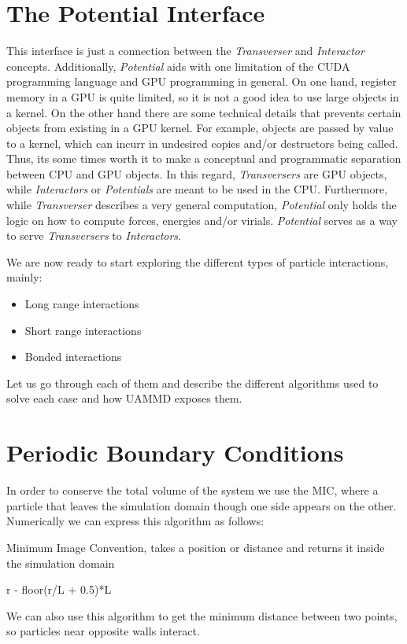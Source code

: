 \documentclass[ twoside,openright,titlepage,numbers=noenddot,%
headinclude,footinclude,cleardoublepage=empty,abstract=on,
BCOR=5mm,paper=a4,fontsize=11pt, dvipsnames
]{scrreprt}
\newcommand{\uammd}{\gls{UAMMD}\xspace}
\newcommand{\gpu}{\gls{GPU}\xspace}
\begin{document}
\section{The Potential Interface} \label{sec:potential}

This interface is just a connection between the \emph{Transverser} and \emph{Interactor} concepts. Additionally, \emph{Potential} aids with one limitation of the CUDA programming language and \gls{GPU} programming in general. On one hand, register memory in a \gpu is quite limited, so it is not a good idea to use large objects in a kernel. On the other hand there are some technical details that prevents certain objects from existing in a \gpu kernel. For example, objects are passed by value to a kernel, which can incurr in undesired copies and/or destructors being called. Thus, its some times worth it to make a conceptual and programmatic separation between CPU and \gpu objects.
In this regard, \emph{Transversers} are \gpu objects, while \emph{Interactors} or \emph{Potentials} are meant to be used in the CPU.
Furthermore, while \emph{Transverser} describes a very general computation, \emph{Potential} only holds the logic on how to compute forces, energies and/or virials.
\emph{Potential} serves as a way to serve \emph{Transversers} to \emph{Interactors}.


We are now ready to start exploring the different types of particle interactions, mainly:
\begin{itemize}
\item Long range interactions
\item Short range interactions
\item Bonded interactions
\end{itemize}

Let us go through each of them and describe the different algorithms used to solve each case and how \uammd exposes them.


\section{Periodic Boundary Conditions}
In order to conserve the total volume of the system we use the \gls{MIC}, where a particle that leaves the simulation domain though one side appears on the other.
Numerically we can express this algorithm as follows:

\begin{algorithm}
  \caption{Minimum Image Convention, takes a position or distance and returns it inside the simulation domain}
  \begin{algorithmic}[1]
    \State \Return r - floor(r/L + 0.5)*L
    \EndFunction
  \end{algorithmic}
\end{algorithm}
We can also use this algorithm to get the minimum distance between two points, so particles near opposite walls interact.
\end{document}
